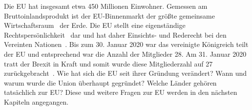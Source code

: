 \noindent
Die EU hat insgesamt etwa 450 Millionen Einwohner. Gemessen am Bruttoinlandsprodukt ist der EU-Binnenmarkt der größte gemeinsame Wirtschaftsraum~\cite{wirtschaftsraumEU} der Erde. Die EU stellt eine eigenständige Rechtspersönlichkeit~\cite{rechtpersoenlichkeitEU} dar und hat daher Einsichts- und Rederecht bei den Vereinten Nationen~\cite{vereinteNationen}.\newline
Bis zum 30. Januar 2020 war das vereinigte Königreich teilt der EU und entsprechend war die Anzahl der Mitglieder 28. Am 31. Januar 2020  tratt der Brexit in Kraft und somit wurde diese Mitgliederzahl auf 27 zurückgebracht~\cite{brexitDatum}. Wie hat sich die EU seit ihrer Gründung verändert? Wann und warum wurde die Union überhaupt gegründet? Welche Länder gehören tatsächlich zur EU? Diese und weitere Fragen zur EU werden in den nächsten Kapiteln angegangen.